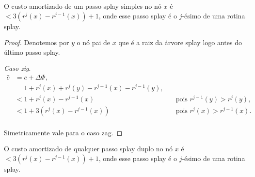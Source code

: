 \begin{lemma}
    O custo amortizado de um passo splay simples no nó $x$ é $< 3(r^{j}(x) - r^{j-1}(x)) + 1$, onde esse passo splay é o $j$-ésimo de uma rotina splay.
\end{lemma}

\begin{proof}
    Denotemos por $y$ o nó pai de $x$ que é a raiz da árvore splay logo antes do último passo splay.

    \textit{Caso zig}.   
    \begin{align*}
        \hat{c} &= c + \Delta \Phi,\\
        &= 1 + r^{j}(x) + r^{j}(y) - r^{j-1}(x) - r^{j-1}(y), \quad & \text{}\\
        &< 1 + r^{j}(x) - r^{j-1}(x) \quad & \text{pois $r^{j-1}(y) > r^{j}(y)$},\\
        &< 1 + 3(r^{j}(x) - r^{j-1}(x)) \quad & \text{pois $r^{j}(x) > r^{j-1}(x)$}.\\
    \end{align*}

    Simetricamente vale para o caso zag.
\end{proof}

\newpage

\begin{lemma}
    O custo amortizado de qualquer passo splay duplo no nó $x$ é $< 3(r^{j}(x) - r^{j-1}(x)) + 1$, onde esse passo splay é o $j$-ésimo de uma rotina splay.
\end{lemma}

